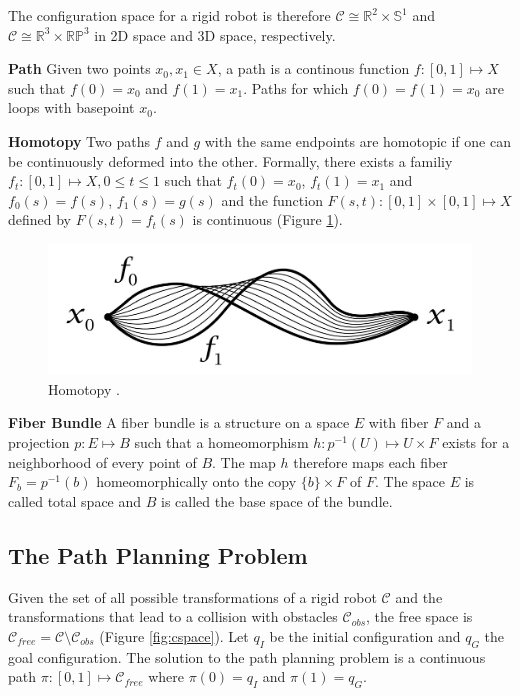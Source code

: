 \documentclass[11pt,twocolumn]{article}
\begin{document}
The configuration space for a rigid robot is therefore
\(\mathcal{C} \cong \mathbb{R}^{2} \times \mathbb{S}^{1}\) and
\(\mathcal{C} \cong \mathbb{R}^{3} \times \mathbb{RP}^{3}\) in 2D
space and 3D space, respectively.

\textbf{Path} Given two points \(x_{0}, x_{1} \in X\), a path is a
continous function \(f: [0, 1] \mapsto X\) such that \(f(0) = x_{0}\)
and \(f(1) = x_{1}\). Paths for which \(f(0) = f(1) = x_{0}\) are
loops with basepoint \(x_{0}\).

\textbf{Homotopy} Two paths \(f\) and \(g\) with the same endpoints
are homotopic if one can be continuously deformed into the
other. Formally, there exists a familiy
\(f_{t}: [0, 1] \mapsto X, 0 \le t \le 1\) such that
\(f_{t}(0) = x_{0}\), \(f_{t}(1) = x_{1}\) and \(f_{0}(s) = f(s)\),
\(f_{1}(s) = g(s)\) and the function
\(F(s, t): [0, 1] \times [0, 1] \mapsto X\) defined by
\(F(s, t) = f_{t}(s)\) is continuous (Figure \ref{fig:homotopy}).

\begin{figure}[h] \centering \includegraphics[scale=.18]{homotopy}
  \caption{Homotopy \cite{hatcherAlgebraicTopology2002}.}
  \label{fig:homotopy}
\end{figure}

\textbf{Fiber Bundle} A fiber bundle is a structure on a space \(E\)
with fiber \(F\) and a projection \(p: E \mapsto B\) such that a
homeomorphism \(h: p^{-1}(U) \mapsto U \times F\) exists for a
neighborhood of every point of \(B\). The map \(h\) therefore maps
each fiber \(F_{b} = p^{-1}(b)\) homeomorphically onto the copy
\(\{b\} \times F\) of \(F\). The space \(E\) is called total space and
\(B\) is called the base space of the bundle.

\subsection*{The Path Planning Problem} Given the set of all possible
transformations of a rigid robot \(\mathcal{C}\) and the
transformations that lead to a collision with obstacles
\(\mathcal{C}_{obs}\), the free space is
\(\mathcal{C}_{free} = \mathcal{C} \setminus \mathcal{C}_{obs}\)
(Figure \ref{fig:cspace}). Let \(q_I\) be the initial configuration
and \(q_G\) the goal configuration. The solution to the path planning
problem is a continuous path
\(\pi: [0, 1] \mapsto \mathcal{C}_{free}\) where \(\pi(0) = q_I\) and
\(\pi(1) = q_G\).
\end{document}
